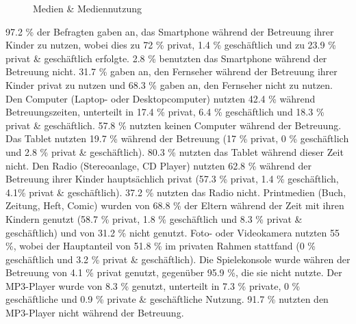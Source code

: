 \begin{figure}[hbt]
\caption{Medien \& Mediennutzung}\label{fig:Mediennutzung}
\centering
{}
\end{figure}

97.2 \% der Befragten gaben an, das Smartphone während der Betreuung ihrer Kinder zu nutzen, wobei dies zu 72 \% privat, 1.4 \% geschäftlich und zu 23.9 \% privat \& geschäftlich erfolgte. 2.8 \% benutzten das Smartphone während der Betreuung nicht. 31.7 \% gaben an, den Fernseher während der Betreuung ihrer Kinder privat zu nutzen und 68.3 \% gaben an, den Fernseher nicht zu nutzen. Den Computer (Laptop- oder Desktopcomputer) nutzten 42.4 \% während Betreuungszeiten, unterteilt in 17.4 \% privat, 6.4 \% geschäftlich und 18.3 \% privat \& geschäftlich. 57.8 \% nutzten keinen Computer während der Betreuung. Das Tablet nutzten 19.7 \% während der Betreuung (17 \% privat, 0 \% geschäftlich und 2.8 \% privat \& geschäftlich). 80.3 \% nutzten das Tablet während dieser Zeit nicht. Den Radio (Stereoanlage, CD Player) nutzten 62.8 \% während der Betreuung ihrer Kinder hauptsächlich privat (57.3 \% privat, 1.4 \% geschäftlich, 4.1\% privat \& geschäftlich). 37.2 \% nutzten das Radio nicht. Printmedien (Buch, Zeitung, Heft, Comic) wurden von 68.8 \% der Eltern während der Zeit mit ihren Kindern genutzt (58.7 \% privat, 1.8 \% geschäftlich und 8.3 \% privat \& geschäftlich) und von 31.2 \% nicht genutzt. Foto- oder Videokamera nutzten 55 \%, wobei der Hauptanteil von 51.8 \% im privaten Rahmen stattfand (0 \% geschäftlich und 3.2 \% privat \& geschäftlich). Die Spielekonsole wurde währen der Betreuung von 4.1 \% privat genutzt, gegenüber 95.9 \%, die sie nicht nutzte. Der MP3-Player wurde von 8.3 \% genutzt, unterteilt in 7.3 \% private, 0 \% geschäftliche und 0.9 \% private \& geschäftliche Nutzung. 91.7 \% nutzten den MP3-Player nicht während der Betreuung.

